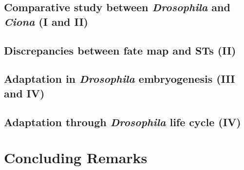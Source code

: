 \documentclass[officiallayout]{tktla_modified}
\begin{document}
%	

\section{Comparative study between \textit{Drosophila} and \textit{Ciona} (I and II)}
	

%	

\section{Discrepancies between fate map and STs (II)}
	

\section{Adaptation in \textit{Drosophila} embryogenesis (III and IV)}
	
\section{Adaptation through \textit{Drosophila} life cycle (IV)}
	
	\clearpage




\chapter{Concluding Remarks}

\clearpage

%
\end{document}

